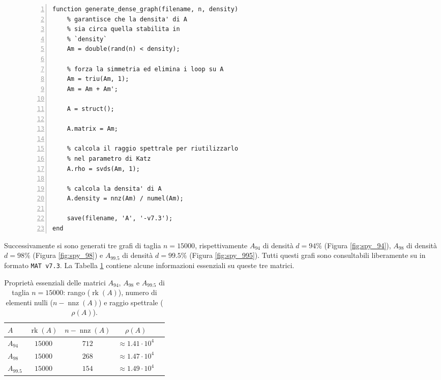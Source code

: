 \documentclass[a4paper]{article}
\DeclareMathOperator{\nnz}{nnz}
\DeclareMathOperator{\rk}{rk}
\begin{document}
\begin{figure}[H]
    \centering
    \begin{lstlisting}[style=Matlab-editor, frame=single, numbers=left, caption={Contenuto del file \texttt{generate\_dense\_graph.m}.}, captionpos=b, label=code:dense_graph]
function generate_dense_graph(filename, n, density)
    % garantisce che la densita' di A
    % sia circa quella stabilita in
    % `density`
    Am = double(rand(n) < density);
    
    % forza la simmetria ed elimina i loop su A
    Am = triu(Am, 1);
    Am = Am + Am';
    
    A = struct();
    
    A.matrix = Am;
    
    % calcola il raggio spettrale per riutilizzarlo
    % nel parametro di Katz
    A.rho = svds(Am, 1);
    
    % calcola la densita' di A
    A.density = nnz(Am) / numel(Am);
    
    save(filename, 'A', '-v7.3');
end            
    \end{lstlisting}
\end{figure}

Successivamente si sono generati tre grafi di taglia $n = 15000$, rispettivamente $A_{94}$ di densità $d = 94\%$ (Figura \ref{fig:spy_94}), $A_{98}$ di densità $d = 98\%$ (Figura \ref{fig:spy_98}) e $A_{99.5}$ di densità $d = 99.5\%$ (Figura \ref{fig:spy_995}).
Tutti questi grafi sono consultabili liberamente su \cite{hearotCode} in formato \texttt{MAT v7.3}. La Tabella \ref{tab:prop_graphs} contiene
alcune informazioni essenziali su queste tre matrici.

\begin{table}[H]
    \centering
    \label{tab:prop_graphs}
        
    \begin{tabular}{|l|c|c|c|c|}       
        \hline
        $A$              & $\rk(A)$  & $n - \nnz(A)$  & $\rho(A)$ \\
        \hline
        $A_{94}$ & $15000$ & $712$ & $\approx 1.41 \cdot 10^4$                  \\
        \hline
        $A_{98}$ & $15000$ & $268$ & $\approx 1.47 \cdot 10^4$                  \\
        \hline
        $A_{99.5}$ & $15000$ & $154$ & $\approx 1.49 \cdot 10^4$                  \\
        \hline
    \end{tabular}

    \caption{Proprietà essenziali delle matrici $A_{94}$, $A_{98}$ e $A_{99.5}$ di taglia $n = 15000$: rango ($\rk(A)$), numero di elementi nulli ($n - \nnz(A)$) e raggio spettrale ($\rho(A)$).}
\end{table}
\end{document}

